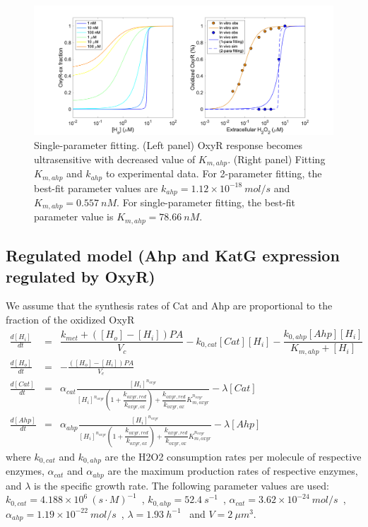 \documentclass[11pt]{article}
\begin{document}
\begin{figure}[h!]
\centering
  \includegraphics[width=1\linewidth]{fit_oxyRox_1para.png}
  \caption{Single-parameter fitting. (Left panel) OxyR response becomes ultrasensitive with decreased value of $K_{m,ahp}$. (Right panel) Fitting $K_{m,ahp}$ and $k_{ahp}$ to experimental data. For 2-parameter fitting, the best-fit parameter values are $k_{ahp}=1.12\times 10^{-18}~mol/s$ and $K_{m,ahp} = 0.557~nM$. For single-parameter fitting, the best-fit parameter value is $K_{m,ahp} = 78.66~nM$.}
  \label{fig:fit_oxyRox_parafit}
\end{figure}

\subsection{Regulated model (Ahp and KatG expression regulated by OxyR)}
We assume that the synthesis rates of Cat and Ahp are proportional to the fraction of the oxidized OxyR
\begin{eqnarray}
\frac{d[H_i]}{dt} &=& \dfrac{k_{met}+([H_o]-[H_i])PA}{V_c} -k_{0,cat}[Cat][H_i] - \dfrac{k_{0,ahp}[Ahp][H_i]}{K_{m,ahp}+[H_i]}\\
\frac{d[H_o]}{dt} &=& -\frac{([H_o]-[H_i])PA}{V_e} \\
\frac{d[Cat]}{dt} &=& \alpha_{cat}\frac{[H_i]^{n_{oxyr}}}{[H_i]^{n_{oxyr}}\left(1+\dfrac{k_{oxyr,red}}{k_{oxyr,ox}}\right)+\dfrac{k_{oxyr,red}}{k_{oxyr,ox}}K_{m,oxyr}^{n_{oxyr}}}-\lambda[Cat] \\
\frac{d[Ahp]}{dt} &=& \alpha_{ahp}\frac{[H_i]^{n_{oxyr}}}{[H_i]^{n_{oxyr}}\left(1+\dfrac{k_{oxyr,red}}{k_{oxyr,ox}}\right)+\dfrac{k_{oxyr,red}}{k_{oxyr,ox}}K_{m,oxyr}^{n_{oxyr}}}-\lambda[Ahp]
\end{eqnarray}
where $k_{0,cat}$ and $k_{0,ahp}$ are the H2O2 consumption rates per molecule of respective enzymes, $\alpha_{cat}$ and $\alpha_{ahp}$ are the maximum production rates of respective enzymes, and $\lambda$ is the specific growth rate. The following parameter values are used: $k_{0,cat}=4.188\times 10^{6}~(s\cdot M)^{-1}$~\cite{claiborne1979purification}, $k_{0,ahp}=52.4~s^{-1}$~\cite{parsonage2008substrate}, $\alpha_{cat}=3.62\times 10^{-24}~mol/s$~\cite{li2014quantifying}, $\alpha_{ahp}=1.19\times 10^{-22}~mol/s$~\cite{li2014quantifying}, $\lambda=1.93~h^{-1}$~\cite{li2014quantifying} and $V=2~\mu m^3$.
\end{document}
